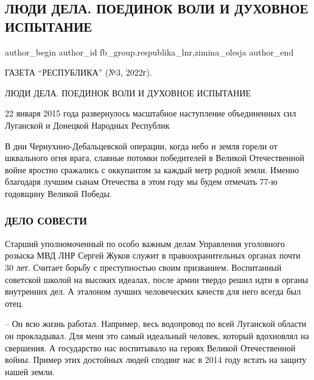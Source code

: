  
 
 
 
 
 
\subsection{ЛЮДИ ДЕЛА. ПОЕДИНОК ВОЛИ И ДУХОВНОЕ ИСПЫТАНИЕ}
\label{sec:21_01_2022.fb.fb_group.respublika_lnr.1.ljudi_dela}
 
\ifcmt
 author_begin
   author_id fb_group.respublika_lnr,zimina_olesja
 author_end
\fi

ГАЗЕТА \enquote{РЕСПУБЛИКА} (№3, 2022г).

ЛЮДИ ДЕЛА. ПОЕДИНОК ВОЛИ И ДУХОВНОЕ ИСПЫТАНИЕ

22 января 2015 года развернулось масштабное наступление объединенных сил
Луганской и Донецкой Народных Республик

В дни Чернухино-Дебальцевской операции, когда небо и земля горели от шквального
огня врага, славные потомки победителей в Великой Отечественной войне яростно
сражались с оккупантом за каждый метр родной земли. Именно благодаря лучшим
сынам Отечества в этом году мы будем отмечать 77-ю годовщину Великой Победы.

\subsubsection{ДЕЛО СОВЕСТИ}

Старший уполномоченный по особо важным делам Управления уголовного розыска МВД
ЛНР Сергей Жуков служит в правоохранительных органах почти 30 лет. Считает
борьбу с преступностью своим призванием. Воспитанный советской школой на
высоких идеалах, после армии твердо решил идти в органы внутренних дел. А
эталоном лучших человеческих качеств для него всегда был отец.

– Он всю жизнь работал. Например, весь водопровод по всей Луганской области он
прокладывал. Для меня это самый идеальный человек, который вдохновлял на
свершения. А государство нас воспитывало на героях Великой Отечественной войны.
Пример этих достойных людей сподвиг нас в 2014 году встать на защиту нашей
земли. 

